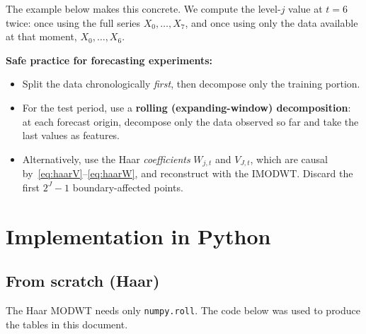 \documentclass[11pt,a4paper]{article}
\begin{document}
The example below makes this concrete. We compute the level-$j$ value at $t=6$ twice: once using the full series
$X_0,\dots,X_7$, and once using only the data available at that moment, $X_0,\dots,X_6$.

\begin{table}[H]
\centering

\caption{The MRA details at $t=6$ change when the future value $X_7$ is removed, so they depend on the future.
The Haar coefficients $W_{1,6}$ and $W_{2,6}$ do not change, because they only use past data. $W_{3,6}$ changes only
because level 3 needs 8 past values and just 7 exist, which triggers the circular boundary.}
\end{table}

\textbf{Safe practice for forecasting experiments:}
\begin{itemize}[leftmargin=1.5em]
  \item Split the data chronologically \emph{first}, then decompose only the training portion.
  \item For the test period, use a \textbf{rolling (expanding-window) decomposition}: at each forecast origin, decompose
        only the data observed so far and take the last values as features.
  \item Alternatively, use the Haar \emph{coefficients} $W_{j,t}$ and $V_{J,t}$, which are causal by~\eqref{eq:haarV}--\eqref{eq:haarW},
        and reconstruct with the IMODWT. Discard the first $2^J-1$ boundary-affected points.
\end{itemize}

\section{Implementation in Python}

\subsection{From scratch (Haar)}

The Haar MODWT needs only \texttt{numpy.roll}. The code below was used to produce the tables in this document.
\end{document}
